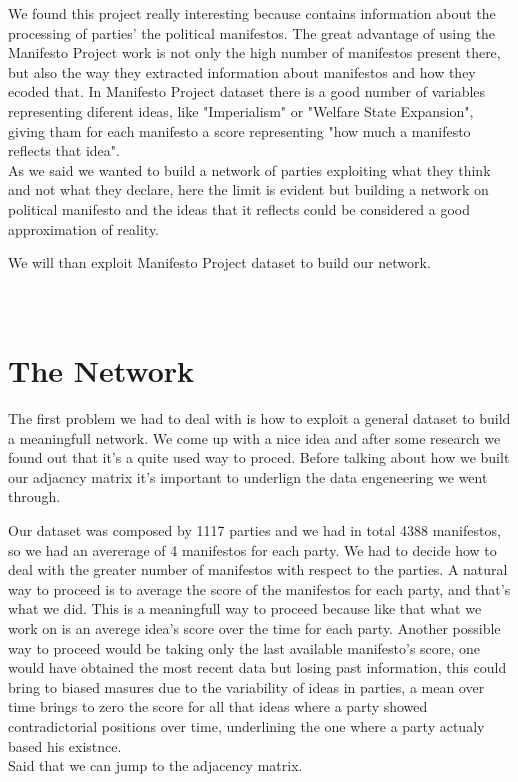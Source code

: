 \documentclass{article}%
\begin{document}
We found this project really interesting because contains information about the processing of parties' the political manifestos. The great advantage of using the Manifesto Project work is not only the high number of manifestos present there, but also 
the way they extracted information about manifestos and how they ecoded that.
In Manifesto Project dataset there is a good number of variables representing diferent ideas, like "Imperialism" or "Welfare State Expansion", giving tham for each manifesto a score representing "how much a manifesto reflects that idea".
\\

As we said we wanted to build a network of parties exploiting what they think and not what they declare, here the limit is evident but building a network on political manifesto and the ideas that it reflects could be considered a good approximation of reality.

We will than exploit Manifesto Project dataset to build our network.
\\
\\
\\


\section{The Network}

The first problem we had to deal with is how to exploit a general dataset to build a meaningfull network. We come up with a nice idea and after some research we found out that it's a quite used way to proced. 
Before talking about how we built our adjacncy matrix it's important to underlign the data engeneering we went through.

Our dataset was composed by 1117 parties and we had in total 4388 manifestos, so we had an avererage of 4 manifestos for each party. We had to decide how to deal with the greater number of manifestos with respect to the parties. A natural way to proceed is to average the score of the manifestos for each party, and that's what we did. This is a meaningfull way to proceed because like that what we work on is an averege idea's score over the time for each party. Another possible way to proceed would be taking only the last available manifesto's score, one would have obtained the most recent data but losing past information, this could bring to biased masures due to the variability of ideas in parties, a mean over time brings to zero the score for all that ideas where a party showed contradictorial positions over time, underlining the one where a party actualy based his existnce.
\\

Said that we can jump to the adjacency matrix.
\end{document}
